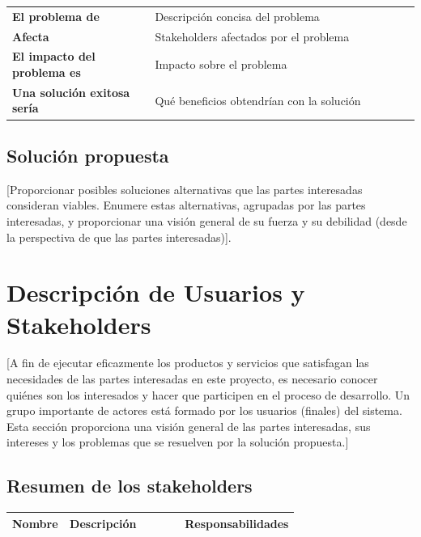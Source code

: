 \documentclass[11pt]{article}
\begin{document}
\begin{table}[H]
  \centering
  \begin{tabular}{p{0.35\linewidth}|p{0.65\linewidth}}
    \toprule
    \textbf{El problema de} & Descripción concisa del problema\\
    \textbf{Afecta} & Stakeholders afectados por el problema \\
    \textbf{El impacto del problema es} & Impacto sobre el problema \\
    \textbf{Una solución exitosa sería} & Qué beneficios obtendrían con la solución\\
    \bottomrule
  \end{tabular}
\end{table}

\subsection{Solución propuesta}
[Proporcionar posibles soluciones alternativas que las partes interesadas consideran viables. Enumere estas alternativas, agrupadas por las partes interesadas, y proporcionar una visión general de su fuerza y su debilidad (desde la perspectiva de que las partes interesadas)].

\newpage

\section{Descripción de Usuarios y Stakeholders}
[A fin de ejecutar eficazmente los productos y servicios que satisfagan las necesidades de las partes interesadas en este proyecto, es necesario conocer quiénes son los interesados y hacer que participen en el proceso de desarrollo. Un grupo importante de actores está formado por los usuarios (finales) del sistema.
Esta sección proporciona una visión general de las partes interesadas, sus intereses y los problemas que se resuelven por la solución propuesta.]

\subsection{Resumen de los stakeholders}
\begin{table}[H]
  \centering
  \begin{tabular}{p{0.2\linewidth}p{0.4\linewidth}p{0.4\linewidth}}
    \toprule
    \textbf{Nombre} & \textbf{Descripción} & \textbf{Responsabilidades} \\
    \midrule
    \bottomrule
  \end{tabular}
\end{table}
\end{document}
